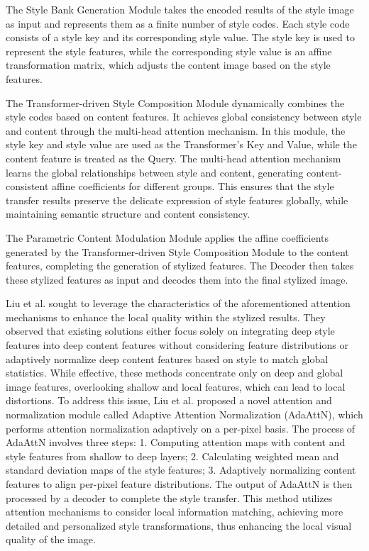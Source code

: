 \documentclass[preprint,12pt]{elsarticle}
\begin{document}
The Style Bank Generation Module takes the encoded results of the style image as input and represents them as a finite number of style codes. Each style code consists of a style key and its corresponding style value. The style key is used to represent the style features, while the corresponding style value is an affine transformation matrix, which adjusts the content image based on the style features. 

The Transformer-driven Style Composition Module dynamically combines the style codes based on content features. It achieves global consistency between style and content through the multi-head attention mechanism. In this module, the style key and style value are used as the Transformer’s Key and Value, while the content feature is treated as the Query. The multi-head attention mechanism learns the global relationships between style and content, generating content-consistent affine coefficients for different groups. This ensures that the style transfer results preserve the delicate expression of style features globally, while maintaining semantic structure and content consistency.

The Parametric Content Modulation Module applies the affine coefficients generated by the Transformer-driven Style Composition Module to the content features, completing the generation of stylized features. The Decoder then takes these stylized features as input and decodes them into the final stylized image.

Liu et al.\citep{48liu2021adaattn} sought to leverage the characteristics of the aforementioned attention mechanisms to enhance the local quality within the stylized results. They observed that existing solutions either focus solely on integrating deep style features into deep content features without considering feature distributions or adaptively normalize deep content features based on style to match global statistics\citep{04huang2017arbitrary,39dumoulin2016learned,41jing2020dynamic}. While effective, these methods concentrate only on deep and global image features, overlooking shallow and local features, which can lead to local distortions. To address this issue, Liu et al. proposed a novel attention and normalization module called Adaptive Attention Normalization (AdaAttN), which performs attention normalization adaptively on a per-pixel basis. The process of AdaAttN involves three steps: 1. Computing attention maps with content and style features from shallow to deep layers; 2. Calculating weighted mean and standard deviation maps of the style features; 3. Adaptively normalizing content features to align per-pixel feature distributions. The output of AdaAttN is then processed by a decoder to complete the style transfer. This method utilizes attention mechanisms to consider local information matching, achieving more detailed and personalized style transformations, thus enhancing the local visual quality of the image.
\end{document}
